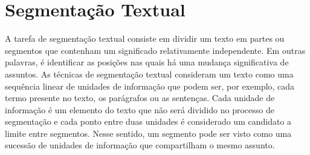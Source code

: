 
\section{Segmentação Textual} \label{sec:segmentacao}


A tarefa de segmentação textual consiste em dividir um texto em partes ou segmentos que contenham um significado relativamente independente. Em outras palavras, é identificar as posições nas quais há uma mudança significativa de assuntos. As técnicas de segmentação textual consideram um texto como uma sequência linear de unidades de informação que podem ser, por exemplo, cada termo presente no texto, os parágrafos ou as sentenças. Cada unidade de informação é um elemento do texto que não será dividido no processo de segmentação e cada ponto entre duas unidades é considerado um candidato a limite entre segmentos. Nesse sentido, um segmento pode ser visto como uma sucessão de unidades de informação que compartilham o mesmo assunto.

















